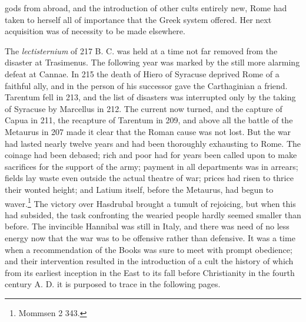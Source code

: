 \documentclass[a4paper, 11pt, oneside, polutonikogreek, english]{article}
\begin{document}
gods from abroad, and the introduction of other cults entirely new, Rome had taken to herself all of importance that the Greek system offered. Her next acquisition was of necessity to be made elsewhere.

The \emph{lectisternium} of 217 B. C. was held at a time not far removed from the disaster at Trasimenus. The following year was marked by the still more alarming defeat at Cannae. In 215 the death of Hiero of Syracuse deprived Rome of a faithful ally, and in the person of his successor gave the Carthaginian a friend. Tarentum fell in 213, and the list of disasters was interrupted only by the taking of Syracuse by Marcellus in 212. The current now turned, and the capture of Capua in 211, the recapture of Tarentum in 209, and above all the battle of the Metaurus in 207 made it clear that the Roman cause was not lost. But the war had lasted nearly twelve years and had been thoroughly exhausting to Rome. The coinage had been debased; rich and poor had for years been called upon to make sacrifices for the support of the army; payment in all departments was in arrears; fields lay waste even outside the actual theatre of war; prices had risen to thrice their wonted height; and Latium itself, before the Metaurus, had begun to waver.\footnote{Mommsen 2 343.} The victory over Hasdrubal brought a tumult of rejoicing, but when this had subsided, the task confronting the wearied people hardly seemed smaller than before. The invincible Hannibal was still in Italy, and there was need of no less energy now that the war was to be offensive rather than defensive. It was a time when a recommendation of the Books was sure to meet with prompt obedience; and their intervention resulted in the introduction of a cult the history of which from its earliest inception in the East to its fall before Christianity in the fourth century A. D. it is purposed to trace in the following pages.
\end{document}
